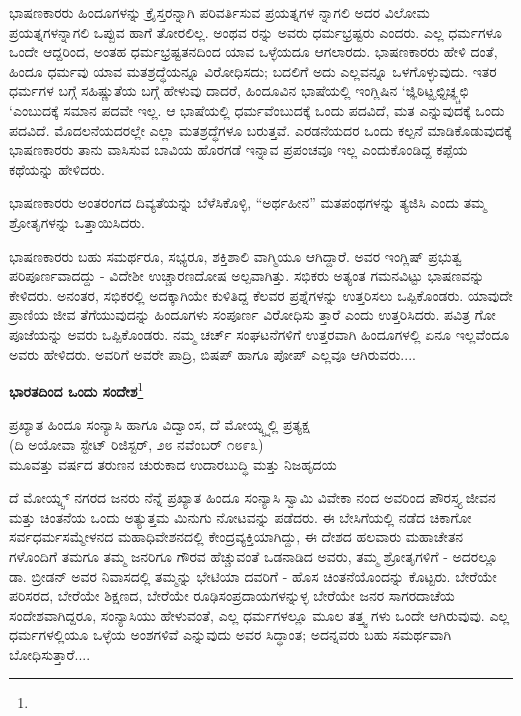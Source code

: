 ಭಾಷಣಕಾರರು ಹಿಂದೂಗಳನ್ನು ಕ್ರೈಸ್ತರನ್ನಾಗಿ ಪರಿವರ್ತಿಸುವ ಪ್ರಯತ್ನಗಳ ನ್ನಾಗಲಿ ಅದರ ವಿಲೋಮ ಪ್ರಯತ್ನಗಳನ್ನಾಗಲಿ ಒಪ್ಪುವ ಹಾಗೆ ತೋರಲಿಲ್ಲ. ಅಂಥವ ರನ್ನು ಅವರು ಧರ್ಮಭ್ರಷ್ಟರು ಎಂದರು. ಎಲ್ಲ ಧರ್ಮಗಳೂ ಒಂದೇ ಆದ್ದರಿಂದ, ಅಂತಹ ಧರ್ಮಭ್ರಷ್ಟತನದಿಂದ ಯಾವ ಒಳ್ಳೆಯದೂ ಆಗಲಾರದು. ಭಾಷಣಕಾರರು ಹೇಳಿ ದಂತೆ, ಹಿಂದೂ ಧರ್ಮವು ಯಾವ ಮತಶ್ರದ್ಧೆಯನ್ನೂ ವಿರೋಧಿಸದು; ಬದಲಿಗೆ ಅದು ಎಲ್ಲವನ್ನೂ ಒಳಗೊಳ್ಳುವುದು. ಇತರ ಧರ್ಮಗಳ ಬಗ್ಗೆ ಸಹಿಷ್ಣುತೆಯ ಬಗ್ಗೆ ಹೇಳುವು ದಾದರೆ, ಹಿಂದೂವಿನ ಭಾಷೆಯಲ್ಲಿ ಇಂಗ್ಲಿಷಿನ ‘ಜ್ಞಿಠಿಟ್ಝಛ್ಟಿಚ್ಞ್ಚಛಿ ‘ಎಂಬುದಕ್ಕೆ ಸಮಾನ ಪದವೇ ಇಲ್ಲ. ಆ ಭಾಷೆಯಲ್ಲಿ ಧರ್ಮವೆಂಬುದಕ್ಕೆ ಒಂದು ಪದವಿದೆ, ಮತ ಎನ್ನುವುದಕ್ಕೆ ಒಂದು ಪದವಿದೆ. ಮೊದಲನೆಯದರಲ್ಲೇ ಎಲ್ಲಾ ಮತಶ್ರದ್ಧೆಗಳೂ ಬರುತ್ತವೆ. ಎರಡನೆಯದರ ಒಂದು ಕಲ್ಪನೆ ಮಾಡಿಕೊಡುವುದಕ್ಕೆ ಭಾಷಣಕಾರರು ತಾನು ವಾಸಿಸುವ ಬಾವಿಯ ಹೊರಗಡೆ ಇನ್ನಾವ ಪ್ರಪಂಚವೂ ಇಲ್ಲ ಎಂದುಕೊಂಡಿದ್ದ ಕಪ್ಪೆಯ ಕಥೆಯನ್ನು ಹೇಳಿದರು.

ಭಾಷಣಕಾರರು ಅಂತರಂಗದ ದಿವ್ಯತೆಯನ್ನು ಬೆಳೆಸಿಕೊಳ್ಳಿ, “ಅರ್ಥಹೀನ” ಮತಪಂಥಗಳನ್ನು ತ್ಯಜಿಸಿ ಎಂದು ತಮ್ಮ ಶ್ರೋತೃಗಳನ್ನು ಒತ್ತಾಯಿಸಿದರು.

ಭಾಷಣಕಾರರು ಬಹು ಸಮರ್ಥರೂ, ಸಭ್ಯರೂ, ಶಕ್ತಿಶಾಲಿ ವಾಗ್ಮಿಯೂ ಆಗಿದ್ದಾರೆ. ಅವರ ಇಂಗ್ಲಿಷ್ ಪ್ರಭುತ್ವ ಪರಿಪೂರ್ಣವಾದದ್ದು - ವಿದೇಶೀ ಉಚ್ಚಾರಣದೋಷ ಅಲ್ಪವಾಗಿತ್ತು. ಸಭಿಕರು ಅತ್ಯಂತ ಗಮನವಿಟ್ಟು ಭಾಷಣವನ್ನು ಕೇಳಿದರು. ಅನಂತರ, ಸಭಿಕರಲ್ಲಿ ಅದಕ್ಕಾಗಿಯೇ ಕುಳಿತಿದ್ದ ಕೆಲವರ ಪ್ರಶ್ನೆಗಳನ್ನು ಉತ್ತರಿಸಲು ಒಪ್ಪಿಕೊಂಡರು. ಯಾವುದೇ ಪ್ರಾಣಿಯ ಜೀವ ತೆಗೆಯುವುದನ್ನು ಹಿಂದೂಗಳು ಸಂಪೂರ್ಣ ವಿರೋಧಿಸು ತ್ತಾರೆ ಎಂದು ಉತ್ತರಿಸಿದರು. ಪವಿತ್ರ ಗೋ ಪೂಜೆಯನ್ನು ಅವರು ಒಪ್ಪಿಕೊಂಡರು. ನಮ್ಮ ಚರ್ಚ್ ಸಂಘಟನೆಗಳಿಗೆ ಉತ್ತರವಾಗಿ ಹಿಂದೂಗಳಲ್ಲಿ ಏನೂ ಇಲ್ಲವೆಂದೂ ಅವರು ಹೇಳಿದರು. ಅವರಿಗೆ ಅವರೇ ಪಾದ್ರಿ, ಬಿಷಪ್ ಹಾಗೂ ಪೋಪ್ ಎಲ್ಲವೂ ಆಗಿರುವರು....

\begin{center}
\textbf{ಭಾರತದಿಂದ ಒಂದು ಸಂದೇಶ}\footnote{}
\end{center}

\begin{center}
ಪ್ರಖ್ಯಾತ ಹಿಂದೂ ಸಂನ್ಯಾಸಿ ಹಾಗೂ ವಿದ್ವಾಂಸ, ದೆ ಮೋಯ್ನ್ಸ್ನಲ್ಲಿ ಪ್ರತ್ಯಕ್ಷ \\(ದಿ ಅಯೋವಾ ಸ್ಟೇಟ್ ರಿಜಿಸ್ಟರ್, ೨೮ ನವೆಂಬರ್ ೧೮೯೩)\\ಮೂವತ್ತು ವರ್ಷದ ತರುಣನ ಚುರುಕಾದ ಉದಾರಬುದ್ಧಿ ಮತ್ತು ನಿಜಹೃದಯ
\end{center}

ದೆ ಮೋಯ್ನ್ಸ್ ನಗರದ ಜನರು ನೆನ್ನೆ ಪ್ರಖ್ಯಾತ ಹಿಂದೂ ಸಂನ್ಯಾಸಿ ಸ್ವಾಮಿ ವಿವೇಕಾ ನಂದ ಅವರಿಂದ ಪೌರಸ್ತ್ಯ ಜೀವನ ಮತ್ತು ಚಿಂತನೆಯ ಒಂದು ಅತ್ಯುತ್ತಮ ಮಿನುಗು ನೋಟವನ್ನು ಪಡೆದರು. ಈ ಬೇಸಿಗೆಯಲ್ಲಿ ನಡೆದ ಚಿಕಾಗೋ ಸರ್ವಧರ್ಮಸಮ್ಮೇಳನದ ಮಹಾಧಿವೇಶನದಲ್ಲಿ ಕೇಂದ್ರವ್ಯಕ್ತಿಯಾಗಿದ್ದು, ಈ ದೇಶದ ಹಲವಾರು ಮಹಾಚೇತನ ಗಳೊಂದಿಗೆ ತಮಗೂ ತಮ್ಮ ಜನರಿಗೂ ಗೌರವ ಹೆಚ್ಚುವಂತೆ ಒಡನಾಡಿದ ಅವರು, ತಮ್ಮ ಶ್ರೋತೃಗಳಿಗೆ - ಅದರಲ್ಲೂ ಡಾ. ಬ್ರೀಡನ್ ಅವರ ನಿವಾಸದಲ್ಲಿ ತಮ್ಮನ್ನು ಭೇಟಿಯಾ ದವರಿಗೆ - ಹೊಸ ಚಿಂತನೆಯೊಂದನ್ನು ಕೊಟ್ಟರು. ಬೇರೆಯೇ ಪರಿಸರದ, ಬೇರೆಯೇ ಶಿಕ್ಷಣದ, ಬೇರೆಯೇ ರೂಢಿಸಂಪ್ರದಾಯಗಳನ್ನುಳ್ಳ ಬೇರೆಯೇ ಜನರ ಸಾಗರದಾಚೆಯ ಸಂದೇಶವಾಗಿದ್ದರೂ, ಸಂನ್ಯಾಸಿಯು ಹೇಳುವಂತೆ, ಎಲ್ಲ ಧರ್ಮಗಳಲ್ಲೂ ಮೂಲ ತತ್ತ್ವ ಗಳು ಒಂದೇ ಆಗಿರುವುವು. ಎಲ್ಲ ಧರ್ಮಗಳಲ್ಲಿಯೂ ಒಳ್ಳೆಯ ಅಂಶಗಳಿವೆ ಎನ್ನುವುದು ಅವರ ಸಿದ್ಧಾಂತ; ಅದನ್ನವರು ಬಹು ಸಮರ್ಥವಾಗಿ ಬೋಧಿಸುತ್ತಾರೆ....

